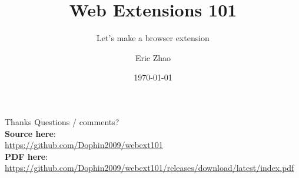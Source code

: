 \documentclass[xcolor={dvipsnames},xtable]{beamer}
\title{Web Extensions 101}
\subtitle{Let's make a browser extension}
\date{\today}
\author{Eric Zhao}
\begin{document}

\newcommand{\sectiontitle}{}
\newcommand{\currenttitle}{}

\maketitle

\newcommand{\subdir}{sections}
\newcommand{\emojisubdir}{emojisub}
\newcommand{\templatedir}{template}






\renewcommand{\currenttitle}{Thanks}
\begin{frame}{\currenttitle}
  Questions / comments? \\[3em]

  \textbf{Source here}: \\
  {\scriptsize \url{https://github.com/Dophin2009/webext101}} \\[1em]

  \textbf{PDF here}: \\
  {\scriptsize \url{https://github.com/Dophin2009/webext101/releases/download/latest/index.pdf}}
\end{frame}
\end{document}
